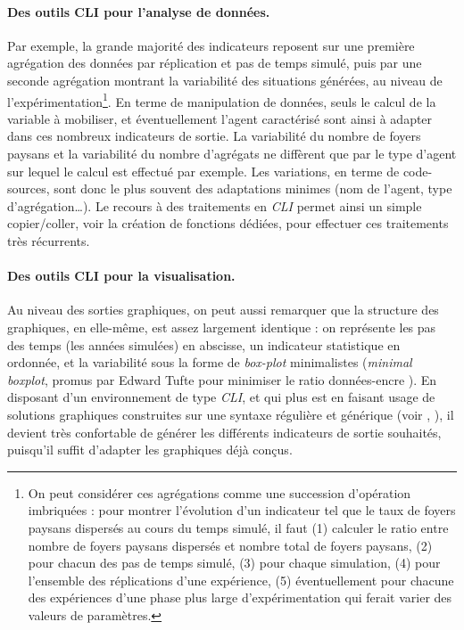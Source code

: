 \paragraph{Des outils CLI pour l'analyse de données.}
Par exemple, la grande majorité des indicateurs reposent sur une première agrégation des données par réplication et pas de temps simulé, puis par une seconde agrégation montrant la variabilité des situations générées, au niveau de l'expérimentation\footnote{
	On peut considérer ces agrégations comme une succession d'opération imbriquées : pour montrer l'évolution d'un indicateur tel que le taux de foyers paysans dispersés au cours du temps simulé, il faut (1) calculer le ratio entre nombre de foyers paysans dispersés et nombre total de foyers paysans, (2) pour chacun des pas de temps simulé, (3) pour chaque simulation, (4) pour l'ensemble des réplications d'une expérience, (5) éventuellement pour chacune des expériences d'une phase plus large d'expérimentation qui ferait varier des valeurs de paramètres.
}.
En terme de manipulation de données, seuls le calcul de la variable à mobiliser, et éventuellement l'agent caractérisé sont ainsi à adapter dans ces nombreux indicateurs de sortie.
La variabilité du nombre de foyers paysans et la variabilité du nombre d'agrégats ne diffèrent que par le type d'agent sur lequel le calcul est effectué par exemple.
Les variations, en terme de code-sources, sont donc le plus souvent des adaptations minimes (nom de l'agent, type d'agrégation\ldots).
Le recours à des traitements en \textit{CLI} permet ainsi un simple copier/coller, voir la création de fonctions dédiées, pour effectuer ces traitements très récurrents.

\paragraph{Des outils CLI pour la visualisation.}
Au niveau des sorties graphiques, on peut aussi remarquer que la structure des graphiques, en elle-même, est assez largement identique : on représente les pas des temps (les années simulées) en abscisse, un indicateur statistique en ordonnée, et la variabilité sous la forme de \textit{box-plot} minimalistes (\og \textit{minimal boxplot}\fg{}, promus par Edward Tufte pour minimiser le ratio données-encre \autocite[123-125]{tufte_visual_2001}).
En disposant d'un environnement de type \textit{CLI}, et qui plus est en faisant usage de solutions graphiques construites sur une syntaxe régulière et générique (voir , ), il devient très confortable de générer les différents indicateurs de sortie souhaités, puisqu'il suffit d'adapter les graphiques déjà conçus.

